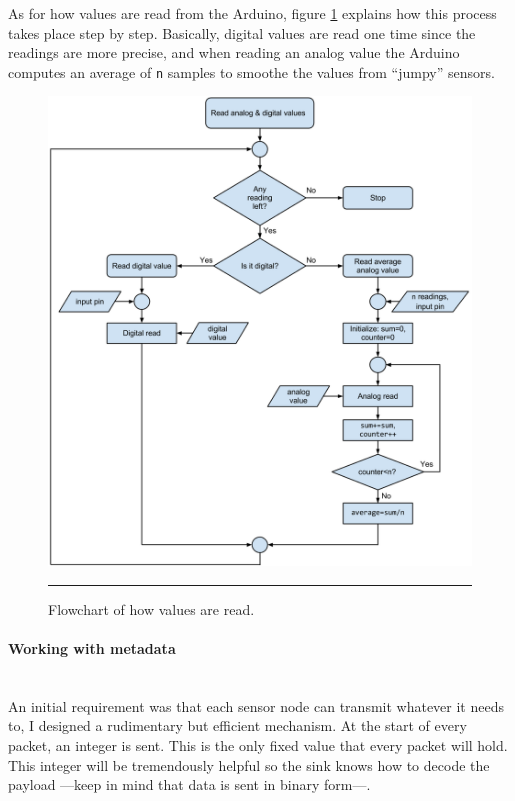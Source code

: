 As for how values are read from the Arduino, figure \ref{fig:readvalues} explains how this process takes place step by step. Basically, digital values are read one time since the readings are more precise, and when reading an analog value the Arduino computes an average of \texttt{n} samples to smoothe the values from ``jumpy'' sensors.

\begin{figure}[htbp]
    \centering
        \includegraphics[scale=0.38]{./Figures/readvalues.png}
        \rule{35em}{0.5pt}
    \caption[Value reading flowchart]{Flowchart of how values are read.}
    \label{fig:readvalues}
\end{figure}

\paragraph{Working with metadata}
~\\
An initial requirement was that each sensor node can transmit whatever it needs to, I designed a rudimentary but efficient mechanism. At the start of every packet, an integer is sent. This is the only fixed value that every packet will hold. This integer will be tremendously helpful so the sink knows how to decode the payload ---keep in mind that data is sent in binary form---.

